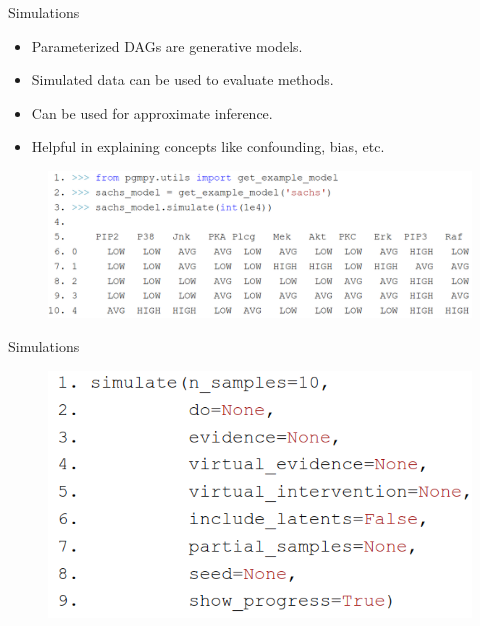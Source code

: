 \documentclass{beamer}
\begin{document}
\begin{frame}{Simulations}
	\begin{itemize}
		\item Parameterized DAGs are generative models.
		\item Simulated data can be used to evaluate methods.
		\item Can be used for approximate inference.
		\item Helpful in explaining concepts like confounding, bias, etc.
	\end{itemize}
	\begin{figure}
		\centering
		\includegraphics[scale=0.3]{imgs/data_sim.png}
	\end{figure}
\end{frame}
\begin{frame}{Simulations}
	\begin{figure}
		\centering
		\includegraphics[scale=0.3]{imgs/simulate_fun.png}
	\end{figure}
\end{frame}
\end{document}
